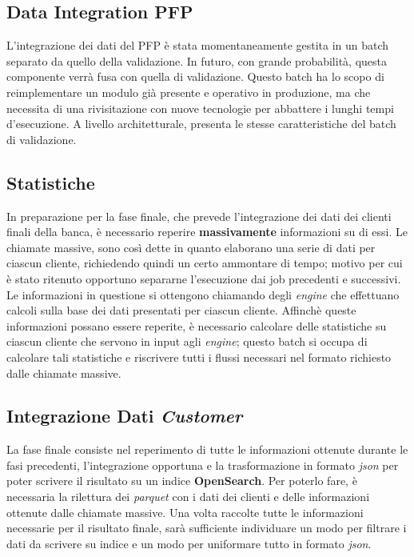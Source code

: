 \subsection{Data Integration PFP}\label{subsec:etl-pfp}
L'integrazione dei dati del PFP è stata momentaneamente gestita in un batch separato da quello della validazione.
In futuro, con grande probabilità, questa componente verrà fusa con quella di validazione.
Questo batch ha lo scopo di reimplementare un modulo già presente e operativo in produzione, ma che necessita di una rivisitazione con nuove tecnologie per abbattere i lunghi tempi d'esecuzione.
A livello architetturale, presenta le stesse caratteristiche del batch di validazione.

\subsection{Statistiche}\label{subsec:etl-stats}
In preparazione per la fase finale, che prevede l'integrazione dei dati dei clienti finali della banca, è necessario reperire \textbf{massivamente} informazioni su di essi.
Le chiamate massive, sono così dette in quanto elaborano una serie di dati per ciascun cliente, richiedendo quindi un certo ammontare di tempo;
motivo per cui è stato ritenuto opportuno separarne l'esecuzione dai job precedenti e successivi.
Le informazioni in questione si ottengono chiamando degli \textit{engine} che effettuano calcoli sulla base dei dati presentati per ciascun cliente.
Affinchè queste informazioni possano essere reperite, è necessario calcolare delle statistiche su ciascun cliente che servono in input agli \textit{engine};
questo batch si occupa di calcolare tali statistiche e riscrivere tutti i flussi necessari nel formato richiesto dalle chiamate massive.

\subsection{Integrazione Dati \textit{Customer}}\label{subsec:etl-customer}
La fase finale consiste nel reperimento di tutte le informazioni ottenute durante le fasi precedenti, l'integrazione opportuna e la trasformazione in formato \textit{json} per poter scrivere il risultato su un indice \textbf{OpenSearch}.
Per poterlo fare, è necessaria la rilettura dei \textit{parquet} con i dati dei clienti e delle informazioni ottenute dalle chiamate massive.
Una volta raccolte tutte le informazioni necessarie per il risultato finale, sarà sufficiente individuare un modo per filtrare i dati da scrivere su indice e un modo per uniformare tutto in formato \textit{json}.

